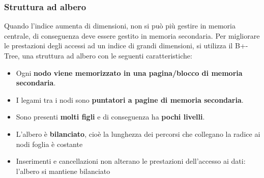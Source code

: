 \documentclass[a4paper,twoside]{article}
\begin{document}
\subsubsection{Struttura ad albero}
Quando l'indice aumenta di dimensioni, non si può più gestire in memoria centrale,
di conseguenza deve essere gestito in memoria secondaria. Per migliorare le prestazioni
degli accessi ad un indice di grandi dimensioni, si utilizza il B+-Tree, una struttura
ad albero con le seguenti caratteristiche:
\begin{itemize}
  \item Ogni \textbf{nodo viene memorizzato in una pagina/blocco di memoria secondaria}.

  \item I legami tra i nodi sono \textbf{puntatori a pagine di memoria secondaria}.

  \item Sono presenti \textbf{molti figli} e di conseguenza ha \textbf{pochi livelli}.

  \item L'albero è \textbf{bilanciato}, cioè la lunghezza dei percorsi che collegano
    la radice ai nodi foglia è costante

  \item Inserimenti e cancellazioni non alterano le prestazioni dell’accesso ai dati:
    l’albero si mantiene bilanciato
\end{itemize}
\end{document}
